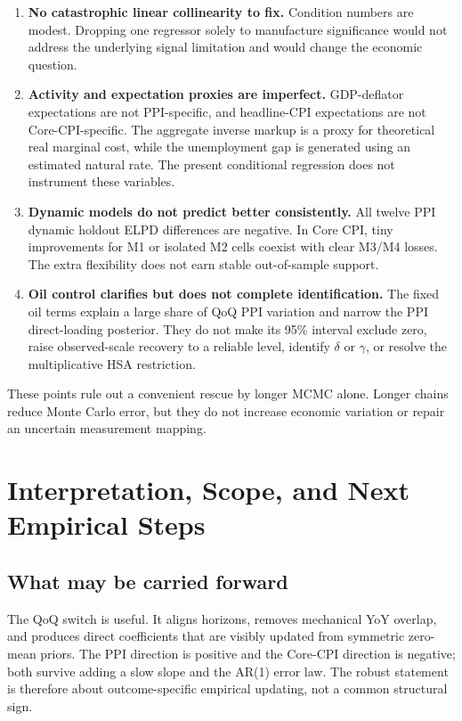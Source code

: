 \documentclass[11pt]{article}
\begin{document}
\begin{enumerate}
\item \textbf{No catastrophic linear collinearity to fix.} Condition numbers are modest.
Dropping one regressor solely to manufacture significance would not address the underlying
signal limitation and would change the economic question.

\item \textbf{Activity and expectation proxies are imperfect.} GDP-deflator expectations
are not PPI-specific, and headline-CPI expectations are not Core-CPI-specific. The aggregate
inverse markup is a proxy for theoretical real marginal cost, while the unemployment gap is
generated using an estimated natural rate. The present conditional regression does not
instrument these variables.

\item \textbf{Dynamic models do not predict better consistently.} All twelve PPI dynamic
holdout ELPD differences are negative. In Core CPI, tiny improvements for M1 or isolated M2
cells coexist with clear M3/M4 losses. The extra flexibility does not earn stable out-of-sample
support.

\item \textbf{Oil control clarifies but does not complete identification.} The fixed oil
terms explain a large share of QoQ PPI variation and narrow the PPI direct-loading posterior.
They do not make its 95\% interval exclude zero, raise observed-scale recovery to a reliable
level, identify $\delta$ or $\gamma$, or resolve the multiplicative HSA restriction.
\end{enumerate}

These points rule out a convenient rescue by longer MCMC alone. Longer chains reduce Monte
Carlo error, but they do not increase economic variation or repair an uncertain measurement
mapping.

\section{Interpretation, Scope, and Next Empirical Steps}

\subsection{What may be carried forward}

The QoQ switch is useful. It aligns horizons, removes mechanical YoY overlap, and produces
direct coefficients that are visibly updated from symmetric zero-mean priors. The PPI
direction is positive and the Core-CPI direction is negative; both survive adding a slow
slope and the AR(1) error law. The robust statement is therefore about outcome-specific
empirical updating, not a common structural sign.
\end{document}
